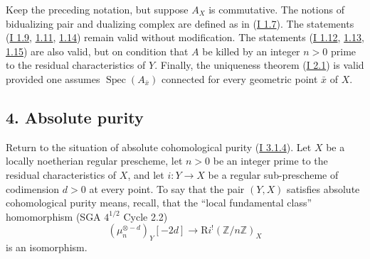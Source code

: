 \documentclass[11pt]{article}
\DeclareMathOperator{\Spec}{Spec}
\newcommand{\R}{\mathrm{R}}
\newcommand{\Z}{\mathbb{Z}}
\providecommand{\R}{\mathrm R}
\providecommand{\Z}{\mathbb Z}
\providecommand{\Spec}{\operatorname{Spec}}
\providecommand{\Spec}{\operatorname{Spec}}
\providecommand{\Spec}{\operatorname{Spec}}
\providecommand{\Spec}{\operatorname{Spec}}
\begin{document}
Keep the preceding notation, but suppose $A_X$ is commutative. The notions of bidualizing pair and dualizing complex are defined as in (\hyperref[sga5:I:definition:1.7]{I 1.7}). The statements (\hyperref[sga5:I:lemma:1.9]{I 1.9}, \hyperref[sga5:I:proposition:1.11]{1.11}, \hyperref[sga5:I:lemma:1.14]{1.14}) remain valid without modification. The statements (\hyperref[sga5:I:proposition:1.12]{I 1.12}, \hyperref[sga5:I:corollary:1.13]{1.13}, \hyperref[sga5:I:corollary:1.15]{1.15}) are also valid, but on condition that $A$ be killed by an integer $n>0$ prime to the residual characteristics of $Y$. Finally, the uniqueness theorem (\hyperref[sga5:I:theorem:2.1]{I 2.1}) is valid provided one assumes $\Spec(A_{\bar{x}})$ connected for every geometric point $\bar{x}$ of $X$.

\subsection*{4. Absolute purity}\label{sga5:I:subsection:4}

Return to the situation of absolute cohomological purity (\hyperref[sga5:I:statement:3.1.4]{I 3.1.4}). Let $X$ be a locally noetherian regular prescheme, let $n>0$ be an integer prime to the residual characteristics of $X$, and let $i:Y\to X$ be a regular sub-prescheme of codimension $d>0$ at every point. To say that the pair $(Y,X)$ satisfies absolute cohomological purity means, recall, that the ``local fundamental class'' homomorphism (SGA $4^{1/2}$ Cycle 2.2)
\begin{equation}\tag{4.1}\label{sga5:I:equation:4.1}
        (\mu_n^{\otimes -d})_Y[-2d]\longrightarrow \R i^!(\Z/n\Z)_X
\end{equation}
is an isomorphism.
\end{document}
